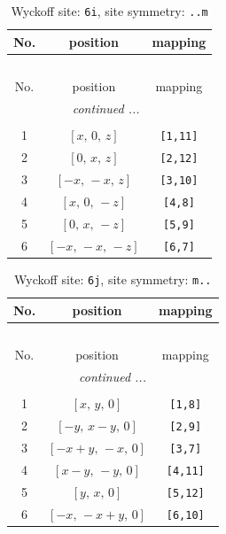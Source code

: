 \documentclass[fleqn,8pt]{jsarticle}
\begin{document}
\renewcommand{\arraystretch}{1.2}
\begin{longtable}{ccc}
\caption{Wyckoff site: {\tt 6i}, site symmetry: {\tt ..m}}
 \\
 \hline \hline
No. & position & mapping \\ \hline \endfirsthead

\multicolumn{2}{l}{\tablename\ \thetable{}} \\
 \hline \hline
No. & position & mapping \\ \hline \endhead

 \hline \hline
\multicolumn{2}{r}{\footnotesize\it continued ...} \\ \endfoot

 \hline \hline
\multicolumn{2}{r}{} \\ \endlastfoot

1 & $\left[ x,\, 0,\, z \right]$ & {\tt [1,11]} \\ \hline
2 & $\left[ 0,\, x,\, z \right]$ & {\tt [2,12]} \\ \hline
3 & $\left[ - x,\, - x,\, z \right]$ & {\tt [3,10]} \\ \hline
4 & $\left[ x,\, 0,\, - z \right]$ & {\tt [4,8]} \\ \hline
5 & $\left[ 0,\, x,\, - z \right]$ & {\tt [5,9]} \\ \hline
6 & $\left[ - x,\, - x,\, - z \right]$ & {\tt [6,7]} \\
\end{longtable}
\renewcommand{\arraystretch}{1.2}
\begin{longtable}{ccc}
\caption{Wyckoff site: {\tt 6j}, site symmetry: {\tt m..}}
 \\
 \hline \hline
No. & position & mapping \\ \hline \endfirsthead

\multicolumn{2}{l}{\tablename\ \thetable{}} \\
 \hline \hline
No. & position & mapping \\ \hline \endhead

 \hline \hline
\multicolumn{2}{r}{\footnotesize\it continued ...} \\ \endfoot

 \hline \hline
\multicolumn{2}{r}{} \\ \endlastfoot

1 & $\left[ x,\, y,\, 0 \right]$ & {\tt [1,8]} \\ \hline
2 & $\left[ - y,\, x - y,\, 0 \right]$ & {\tt [2,9]} \\ \hline
3 & $\left[ - x + y,\, - x,\, 0 \right]$ & {\tt [3,7]} \\ \hline
4 & $\left[ x - y,\, - y,\, 0 \right]$ & {\tt [4,11]} \\ \hline
5 & $\left[ y,\, x,\, 0 \right]$ & {\tt [5,12]} \\ \hline
6 & $\left[ - x,\, - x + y,\, 0 \right]$ & {\tt [6,10]} \\
\end{longtable}
\end{document}
